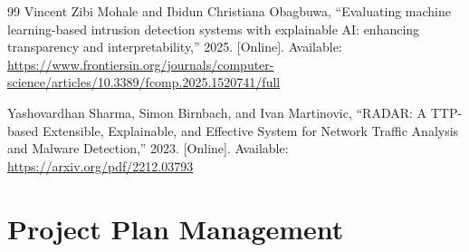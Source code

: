 \documentclass[12pt, a4paper]{article}
\begin{document}
\begin{thebibliography}{99}
Vincent Zibi Mohale and Ibidun Christiana Obagbuwa, ``Evaluating machine learning-based intrusion detection systems with explainable AI: enhancing transparency and interpretability,'' 2025. [Online]. Available: \url{https://www.frontiersin.org/journals/computer-science/articles/10.3389/fcomp.2025.1520741/full}

Yashovardhan Sharma, Simon Birnbach, and Ivan Martinovic, ``RADAR: A TTP-based Extensible, Explainable, and Effective System for Network Traffic Analysis and Malware Detection,'' 2023. [Online]. Available: \url{https://arxiv.org/pdf/2212.03793}

\end{thebibliography}

\newpage
\appendix
\section{Project Plan Management}
\end{document}
